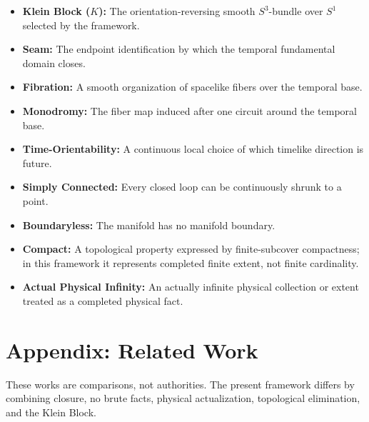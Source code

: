 \documentclass[11pt]{article}
\theoremstyle{canonstyle}
\providecommand{\Klein}{\mathcal{K}}
\def\mathcal#1{#1}%
\begin{document}
\begin{itemize}
    \item \textbf{Klein Block ($\Klein$):} The orientation-reversing smooth $S^3$-bundle over $S^1$ selected by the framework.
    \item \textbf{Seam:} The endpoint identification by which the temporal fundamental domain closes.
    \item \textbf{Fibration:} A smooth organization of spacelike fibers over the temporal base.
    \item \textbf{Monodromy:} The fiber map induced after one circuit around the temporal base.
    \item \textbf{Time-Orientability:} A continuous local choice of which timelike direction is future.
    \item \textbf{Simply Connected:} Every closed loop can be continuously shrunk to a point.
    \item \textbf{Boundaryless:} The manifold has no manifold boundary.
    \item \textbf{Compact:} A topological property expressed by finite-subcover compactness; in this framework it represents completed finite extent, not finite cardinality.
    \item \textbf{Actual Physical Infinity:} An actually infinite physical collection or extent treated as a completed physical fact.
\end{itemize}

\section*{Appendix: Related Work}
{}

These works are comparisons, not authorities. The present framework differs by combining closure, no brute facts, physical actualization, topological elimination, and the Klein Block.
\end{document}
